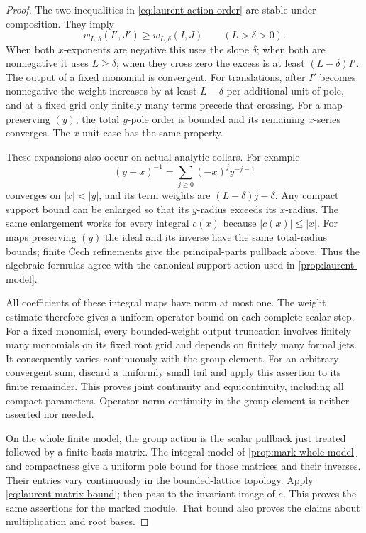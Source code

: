 \begin{proof}
The two inequalities in \cref{eq:laurent-action-order} are stable
under composition.  They imply
\[
 w_{L,\delta}(I',J')\geq w_{L,\delta}(I,J)
 \qquad(L>\delta>0).
\]
When both $x$-exponents are negative this uses the slope $\delta$;
when both are nonnegative it uses $L\geq\delta$; when they cross
zero the excess is at least $(L-\delta)I'$.  The output of a fixed
monomial is convergent.  For translations, after $I'$ becomes
nonnegative the weight increases by at least $L-\delta$ per
additional unit of pole, and at a fixed grid only finitely many
terms precede that crossing.  For a map preserving $(y)$, the
total $y$-pole order is bounded and its remaining $x$-series
converges.  The $x$-unit case has the same property.

These expansions also occur on actual analytic collars.  For
example
\[
 (y+x)^{-1}=\sum_{j\geq0}(-x)^jy^{-j-1}
\]
converges on $|x|<|y|$, and its term weights are
$(L-\delta)j-\delta$.  Any compact support bound can be enlarged
so that its $y$-radius exceeds its $x$-radius.  The same enlargement
works for every integral $c(x)$ because $|c(x)|\leq|x|$.
For maps preserving $(y)$ the ideal and its inverse have the same
total-radius bounds; finite \v Cech refinements give the
principal-parts pullback above.  Thus the algebraic formulas agree
with the canonical support action used in
\cref{prop:laurent-model}.

All coefficients of these integral maps have norm at most one.
The weight estimate therefore gives a uniform operator bound on
each complete scalar step.  For a fixed monomial, every
bounded-weight output truncation involves finitely many monomials
on its fixed root grid and depends on finitely many formal jets.
It consequently varies continuously with the group element.
For an arbitrary convergent sum, discard a uniformly small tail
and apply this assertion to its finite remainder.  This proves
joint continuity and equicontinuity, including all compact
parameters.  Operator-norm continuity in the group element is
neither asserted nor needed.

On the whole finite model, the group action is the scalar pullback
just treated followed by a finite basis matrix.  The integral
model of \cref{prop:mark-whole-model} and compactness give a uniform
pole bound for those matrices and their inverses.  Their entries
vary continuously in the bounded-lattice topology.  Apply
\cref{eq:laurent-matrix-bound}; then pass to the invariant image
of $e$.  This proves the same assertions for the marked module.
That bound also proves the claims about multiplication and root
bases.


\end{proof}
